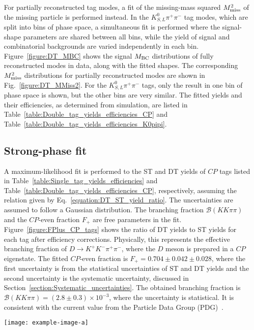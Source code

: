 \documentclass[12pt, a4paper, notitlepage, onecolumn]{article}
\begin{document}
For partially reconstructed tag modes, a fit of the missing-mass squared $M_{\rm miss}^2$ of the missing particle is performed instead. In the $K_{S, L}^0\pi^+\pi^-$ tag modes, which are split into bins of phase space, a simultaneous fit is performed where the signal-shape parameters are shared between all bins, while the yield of signal and combinatorial backgrounds are varied independently in each bin. Figure~\ref{figure:DT_MBC} shows the signal $M_{\rm BC}$ distributions of fully reconstructed modes in data, along with the fitted shapes. The corresponding $M_{\rm miss}^2$ distributions for partially reconstructed modes are shown in Fig.~\ref{figure:DT_MMiss2}. For the $K_{S, L}^0\pi^+\pi^-$ tags, only the result in one bin of phase space is shown, but the other bins are very similar. The fitted yields and their efficiencies, as determined from simulation, are listed in Table~\ref{table:Double_tag_yields_efficiencies_CP} and Table~\ref{table:Double_tag_yields_efficiencies_K0pipi}.

\subsection{Strong-phase fit}
A maximum-likelihood fit is performed to the ST and DT yields of $C\!P$ tags listed in Table~\ref{table:Single_tag_yields_efficiencies} and Table~\ref{table:Double_tag_yields_efficiencies_CP}, respectively, assuming the relation given by Eq.~\eqref{equation:DT_ST_yield_ratio}. The uncertainties are assumed to follow a Gaussian distribution. The branching fraction $\mathcal{B}(KK\pi\pi)$ and the $C\!P$-even fraction $F_+$ are free parameters in the fit. Figure~\ref{figure:FPlus_CP_tags} shows the ratio of DT yields to ST yields for each tag after efficiency corrections. Physically, this represents the effective branching fraction of $D\to K^+K^-\pi^+\pi^-$, where the $D$ meson is prepared in a $C\!P$ eigenstate. The fitted $C\!P$-even fraction is $F_+ = 0.704 \pm 0.042 \pm 0.028$, where the first uncertainty is from the statistical uncertainties of ST and DT yields and the second uncertainty is the systematic uncertainty, discussed in Section~\ref{section:Systematic_uncertainties}. The obtained branching fraction is $\mathcal{B}(KK\pi\pi) = (2.8 \pm 0.3)\times 10^{-3}$, where the uncertainty is statistical. It is consistent with the current value from the Particle Data Group (PDG)~\cite{pdg}.

\begin{figure*}[htb]
    \centering
    \texttt{[image: example-image-a]}
    \caption{The effective branching fraction (BF) of $D\to K^+K^-\pi^+\pi^-$ measured against $C\!P$-odd (top), $D\to\pi^+\pi^-\pi^0$ and $C\!P$-even (bottom) tags. The black dotted lines indicate the values expected from the fit.}
    \label{figure:FPlus_CP_tags}
\end{figure*}
\end{document}
